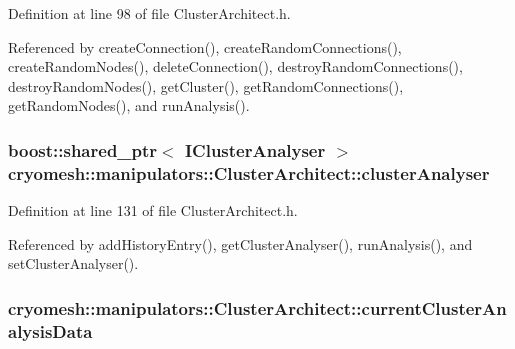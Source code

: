 \-Definition at line 98 of file \-Cluster\-Architect.\-h.



\-Referenced by create\-Connection(), create\-Random\-Connections(), create\-Random\-Nodes(), delete\-Connection(), destroy\-Random\-Connections(), destroy\-Random\-Nodes(), get\-Cluster(), get\-Random\-Connections(), get\-Random\-Nodes(), and run\-Analysis().

\hypertarget{classcryomesh_1_1manipulators_1_1ClusterArchitect_a376af658286be49dc6fc5fea9927c7bc}{
\subsubsection[{cluster\-Analyser}]{\setlength{\rightskip}{0pt plus 5cm}boost\-::shared\-\_\-ptr$<$ {\bf \-I\-Cluster\-Analyser} $>$ {\bf cryomesh\-::manipulators\-::\-Cluster\-Architect\-::cluster\-Analyser}}}\label{classcryomesh_1_1manipulators_1_1ClusterArchitect_a376af658286be49dc6fc5fea9927c7bc}


\-Definition at line 131 of file \-Cluster\-Architect.\-h.



\-Referenced by add\-History\-Entry(), get\-Cluster\-Analyser(), run\-Analysis(), and set\-Cluster\-Analyser().

\hypertarget{classcryomesh_1_1manipulators_1_1ClusterArchitect_a90412a42b771826aa325163eb8dd35ea}{
\subsubsection[{current\-Cluster\-Analysis\-Data}]{ {\bf cryomesh\-::manipulators\-::\-Cluster\-Architect\-::current\-Cluster\-Analysis\-Data}}}\label{classcryomesh_1_1manipulators_1_1ClusterArchitect_a90412a42b771826aa325163eb8dd35ea}


